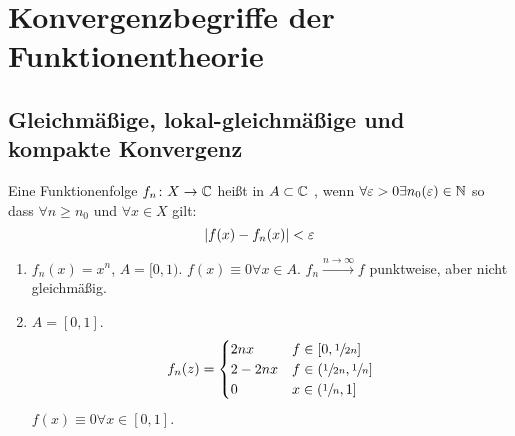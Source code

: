\chapter{Konvergenzbegriffe der Funktionentheorie}
\section{Gleichm\"a\ss ige, lokal-gleichm\"a\ss ige und kompakte Konvergenz}
\begin{definition}
	Eine Funktionenfolge $ f_n\colon X\rightarrow\mathbb{C} $ hei\ss t in $ A\subset\mathbb{C} $ , wenn $ \forall\varepsilon>0\exists n_0(\varepsilon)\in\mathbb{N} $ so dass $ \forall n\geq n_0 $ und $ \forall x\in X $ gilt:
	\[ |f(x)-f_n(x)|<\varepsilon \]
\end{definition}
\begin{beispiel*}
	\begin{enumerate}
		\item 	$ f_n(x)=x^n $, $ A=[0,1) $. $ f(x)\equiv 0\forall x\in A $. $ f_n\xrightarrow{n\to\infty}f $ punktweise, aber nicht gleichm\"a\ss ig.
		\item $ A=[0,1] $.
		\[ f_n(z)=\begin{cases}
		2nx&f\in[0,\sfrac{1}{2n}]\\
		2-2nx&f\in(\sfrac{1}{2n},\sfrac{1}{n}]\\
		0&x\in(\sfrac{1}{n},1]
		\end{cases} \]
		$ f(x)\equiv 0\forall x\in[0,1] $.
	\end{enumerate}
\end{beispiel*}
%
%
%
%
%
%
%
%
%
%
%
